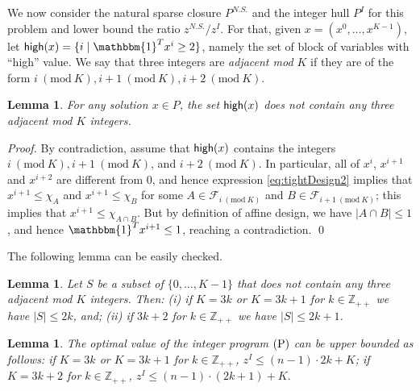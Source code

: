 \documentclass[smallextended]{svjour3}
\newtheorem{lemma}[proposition]{Lemma}
\begin{document}
	We now consider the natural sparse closure $P^{N.S.}$ and the integer hull $P^I$
for this problem and lower bound the ratio $z^{N.S.}/z^I$. For that, given $x = (x^0, \ldots, x^{K-1})$, let ${{\sf high}}(x) = \{ i \mid {\mathbbm{1}}^T x^i \ge 2\}$, namely the set of block of variables with ``high'' value. We say that three integers are \emph{adjacent mod $K$} if they are of the form $i {\ (\text{mod}\ {K})}, i+1 {\ (\text{mod}\ {K})}, i+2 {\ (\text{mod}\ {K})}$. 
	
	\begin{lemma}\label{lemma:adjacent}
		For any solution $x \in P$, the set ${{\sf high}}(x)$ does not contain any three adjacent mod $K$ integers. 
	\end{lemma}
	
	\begin{proof}
		By contradiction, assume that ${{\sf high}}(x)$ contains the integers $i {\ (\text{mod}\ {K})}, i + 1 {\ (\text{mod}\ {K})}$, and $i + 2 {\ (\text{mod}\ {K})}$. In particular, all of $x^i$, $x^{i+1}$ and $x^{i+2}$ are different from 0, and hence expression \eqref{eq:tightDesign2} implies that $x^{i+1} \le \chi_A$ and $x^{i+1} \le \chi_B$ for some $A \in {\mathcal{F}}_{i {\ (\text{mod}\ {K})}}$ and $B \in {\mathcal{F}}_{i + 1 {\ (\text{mod}\ {K})}}$; this implies that $x^{i+1} \le \chi_{A \cap B}$. But by definition of affine design, we have $|A \cap B| \le 1$, and hence ${\mathbbm{1}}^T x^{i+1} \le 1$, reaching a contradiction.{
\ifmp
	\hfill \qed
\fi
}
	\end{proof}

	The following lemma can be easily checked. 
	
	\begin{lemma} \label{lemma:sizeNonAdj}
		Let $S$ be a subset of $\{0, \ldots, K-1\}$ that does not contain any three adjacent mod $K$ integers. Then: (i) if $K = 3k$ or $K = 3k + 1$ for $k \in {\mathbb{Z}}_{++}$ we have $|S| \le 2k$, and; (ii) if $3k + 2$ for $k \in {\mathbb{Z}}_{++}$ we have $|S| \le 2k + 1$. 
	\end{lemma}	

{}

	\begin{lemma} \label{lemma:LBzICycle}
		The optimal value of the integer program $(\textup{P})$ can be upper bounded as follows: if $K = 3k$ or $K = 3k + 1$ for $k \in {\mathbb{Z}}_{++}$, $z^I \le (n - 1) \cdot 2k + K$; if $K = 3k + 2$ for $k \in {\mathbb{Z}}_{++}$, $z^I \le (n - 1) \cdot (2k + 1) + K$.
	\end{lemma}
	
\end{document}
